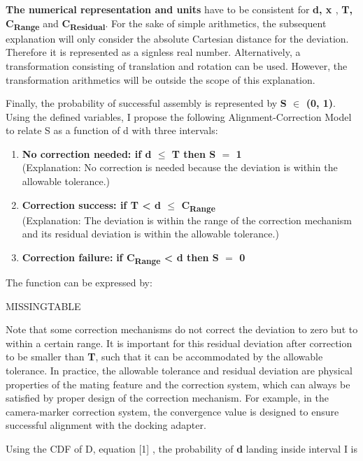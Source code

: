 \textbf{The numerical representation and units }have to be consistent for \textbf{d, x\textsubscript{ }}, \textbf{T, C\textsubscript{Range}} and \textbf{C\textsubscript{Residual}}. For the sake of simple arithmetics, the subsequent explanation will only consider the absolute Cartesian distance for the deviation. Therefore it is represented as a signless real number. Alternatively, a transformation consisting of translation and rotation can be used. However, the transformation arithmetics will be outside the scope of this explanation. 

Finally, the probability of successful assembly is represented by \textbf{S $\in$ (0, 1)}. Using the defined variables, I propose the following Alignment-Correction Model to relate S as a function of d with three intervals: 

\begin{enumerate}
	\item \textbf{No correction needed: if d $\leq$ T then S $=$ 1 \\ }(Explanation: No correction is needed because the deviation is within the allowable tolerance.)

	\item \textbf{Correction success: if T < d $\leq$ C\textsubscript{Range}} \\ (Explanation: The deviation is within the range of the correction mechanism and its residual deviation is within the allowable tolerance.)

	\item \textbf{Correction failure:} \textbf{if C\textsubscript{Range} < d then S $=$ 0}

\end{enumerate}
The function can be expressed by: 


MISSINGTABLE


Note that some correction mechanisms do not correct the deviation to zero but to within a certain range. It is important for this residual deviation after correction to be smaller than \textbf{T}, such that it can be accommodated by the allowable tolerance. In practice, the allowable tolerance and residual deviation are physical properties of the mating feature and the correction system, which can always be satisfied by proper design of the correction mechanism. For example, in the camera-marker correction system, the convergence value is designed to ensure successful alignment with the docking adapter.

Using the CDF of D, equation [1] , the probability of \textbf{d} landing inside interval I is 

